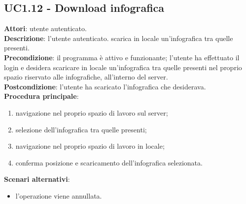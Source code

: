 \subsection{UC1.12 - Download infografica}{
	\label{uc1.12}
	\textbf{Attori}: utente autenticato.\\
	\textbf{Descrizione}: l'utente autenticato. scarica in locale un'infografica tra quelle presenti.\\
	\textbf{Precondizione}: il programma è attivo e funzionante; l'utente ha effettuato il login e desidera scaricare in locale un'infografica tra quelle presenti nel proprio spazio riservato alle infografiche, all'interno del server.	\\
	\textbf{Postcondizione}: l'utente ha scaricato l'infografica che desiderava.\\
	\textbf{Procedura principale}:
	\begin{enumerate}
		\item navigazione nel proprio spazio di lavoro sul server;
		\item selezione dell'infografica tra quelle presenti;
		\item navigazione nel proprio spazio di lavoro in locale;
		\item conferma posizione e scaricamento dell'infografica selezionata.
		\end{enumerate}	
	\textbf{Scenari alternativi}:
	\begin{itemize}
		\item l'operazione viene annullata.
	\end{itemize}
	}